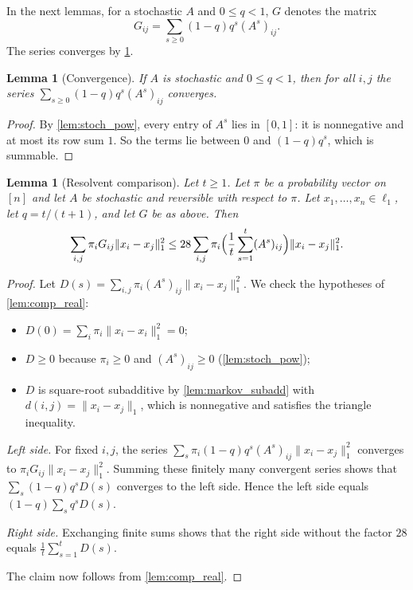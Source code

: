 \documentclass[11pt]{article}
\newtheorem{lemma}[theorem]{Lemma}
\theoremstyle{definition}
\theoremstyle{remark}
\begin{document}
In the next lemmas, for a stochastic $A$ and $0\le q<1$, $G$ denotes the matrix
\[
G_{ij}=\sum_{s\ge0}(1-q)q^s(A^s)_{ij}.
\]
The series converges by \cref{lem:res_summable}.

\begin{lemma}[Convergence]\label{lem:res_summable}
If $A$ is stochastic and $0\le q<1$, then for all $i,j$ the series $\sum_{s\ge0}(1-q)q^s(A^s)_{ij}$ converges.
\end{lemma}
\begin{proof}
By \cref{lem:stoch_pow}, every entry of $A^s$ lies in $[0,1]$: it is nonnegative and at most its row sum $1$. So the terms lie between $0$ and $(1-q)q^s$, which is summable.
\end{proof}

\begin{lemma}[Resolvent comparison]\label{lem:res_comparison}
Let $t\ge1$. Let $\pi$ be a probability vector on $[n]$ and let $A$ be stochastic and reversible with respect to $\pi$. Let $x_1,\dots,x_n\in\ell_1$, let $q=t/(t+1)$, and let $G$ be as above. Then
\[
\sum_{i,j}\pi_iG_{ij}\|x_i-x_j\|_1^2\le28\sum_{i,j}\pi_i\Bigl(\frac1t\sum_{s=1}^t(A^s)_{ij}\Bigr)\|x_i-x_j\|_1^2 .
\]
\end{lemma}
\begin{proof}
Let $D(s)=\sum_{i,j}\pi_i(A^s)_{ij}\|x_i-x_j\|_1^2$. We check the hypotheses of \cref{lem:comp_real}:
\begin{itemize}
\item $D(0)=\sum_i\pi_i\|x_i-x_i\|_1^2=0$;
\item $D\ge0$ because $\pi_i\ge0$ and $(A^s)_{ij}\ge0$ (\cref{lem:stoch_pow});
\item $D$ is square-root subadditive by \cref{lem:markov_subadd} with $d(i,j)=\|x_i-x_j\|_1$, which is nonnegative and satisfies the triangle inequality.
\end{itemize}

\emph{Left side.} For fixed $i,j$, the series $\sum_s\pi_i(1-q)q^s(A^s)_{ij}\|x_i-x_j\|_1^2$ converges to $\pi_iG_{ij}\|x_i-x_j\|_1^2$. Summing these finitely many convergent series shows that $\sum_s(1-q)q^sD(s)$ converges to the left side. Hence the left side equals $(1-q)\sum_sq^sD(s)$.

\emph{Right side.} Exchanging finite sums shows that the right side without the factor $28$ equals $\frac1t\sum_{s=1}^tD(s)$.

The claim now follows from \cref{lem:comp_real}.
\end{proof}
\end{document}
